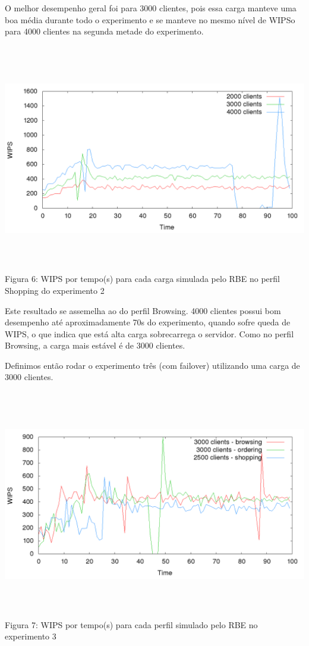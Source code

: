 \documentclass[11pt,twoside]{article}
\begin{document}
O melhor desempenho geral foi para 3000 clientes, pois essa carga manteve uma boa média durante todo o experimento e se manteve no mesmo nível de WIPSo para 4000 clientes na segunda metade do experimento.

\begin{center}
\includegraphics[width=15cm, height=10cm]{images/exp2/plot_shopping}
Figura 6: WIPS por tempo(s) para cada carga simulada pelo RBE no perfil Shopping do experimento 2
\end{center}

Este resultado se assemelha ao do perfil Browsing. 4000 clientes possui bom desempenho até aproximadamente 70s do experimento, quando sofre queda de WIPS, o que indica que está alta carga sobrecarrega o servidor. Como no perfil Browsing, a carga mais estável é de 3000 clientes.

Definimos então rodar o experimento três (com failover) utilizando uma carga de 3000 clientes.

\begin{center}
\includegraphics[width=15cm, height=10cm]{images/exp3/plot_exp3}
Figura 7: WIPS por tempo(s) para cada perfil simulado pelo RBE no experimento 3
\end{center}
\end{document}
